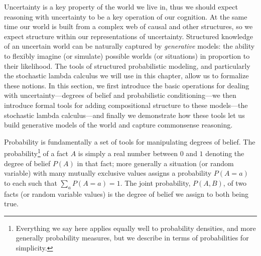 \documentclass[12pt]{article}
\begin{document}
  
%  
  
 

Uncertainty is a key property of the world we live in, thus we should expect reasoning with uncertainty to be a key operation of our cognition. At the same time our world is built from a complex web of causal and other structures, so we expect structure within our representations of uncertainty. Structured knowledge of an uncertain world can be naturally captured by \emph{generative} models: the ability to flexibly imagine (or simulate) possible worlds (or situations) in proportion to their likelihood. The tools of structured probabilistic modeling, and particularly the stochastic lambda calculus we will use in this chapter, allow us to formalize these notions. In this section, we first introduce the basic operations for dealing with uncertainty---degrees of belief and probabilistic conditioning---we then introduce formal tools for adding compositional structure to these models---the stochastic lambda calculus---and finally we demonstrate how these tools let us build generative models of the world and capture commonsense reasoning.

Probability is fundamentally a set of tools for manipulating degrees of belief. The probability\footnote{Everything we say here applies equally well to probability densities, and more generally probability measures, but we describe in terms of probabilities for simplicity.} of a fact $A$ is simply a real number between $0$ and $1$ denoting the degree of belief $P(A)$ in that fact; more generally a situation (or random variable) with many mutually exclusive values assigns a probability $P(A{=}a)$ to each such that $\sum_a P(A{=}a)=1$. The joint probability, $P(A,B)$, of two facts (or random variable values) is the degree of belief we assign to both being true. 
\end{document}
